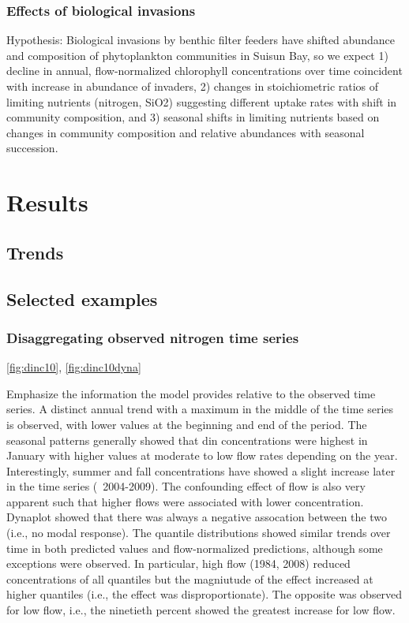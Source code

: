 \documentclass[letterpaper,12pt,oneside]{article}\usepackage[]{graphicx}\usepackage[]{color}
\begin{document}
\subsubsection{Effects of biological invasions}
Hypothesis: Biological invasions by benthic filter feeders have shifted abundance and composition of phytoplankton communities in Suisun Bay, so we expect 1) decline in annual, flow-normalized chlorophyll concentrations over time coincident with increase in abundance of invaders, 2) changes in stoichiometric ratios of limiting nutrients (nitrogen, SiO2) suggesting different uptake rates with shift in community composition, and 3) seasonal shifts in limiting nutrients based on changes in community composition and relative abundances with seasonal succession.

\section{Results}

\subsection{Trends}

\subsection{Selected examples}

\subsubsection{Disaggregating observed nitrogen time series}

\cref{fig:dinc10}, \cref{fig:dinc10dyna}

Emphasize the information the model provides relative to the observed time series.  A distinct annual trend with a maximum in the middle of the time series is observed, with lower values at the beginning and end of the period.  The seasonal patterns generally showed that \ac{din} concentrations were highest in January with higher values at moderate to low flow rates depending on the year. Interestingly, summer and fall concentrations have showed a slight increase later in the time series (~2004-2009).  The confounding effect of flow is also very apparent such that higher flows were associated with lower concentration.  Dynaplot showed that there was always a negative assocation between the two (i.e., no modal response).  The quantile distributions showed similar trends over time in both predicted values and flow-normalized predictions, although some exceptions were observed.  In particular, high flow (1984, 2008) reduced concentrations of all quantiles but the magniutude of the effect increased at higher quantiles (i.e., the effect was disproportionate).  The opposite was observed for low flow, i.e., the ninetieth percent showed the greatest increase for low flow.     
\end{document}
